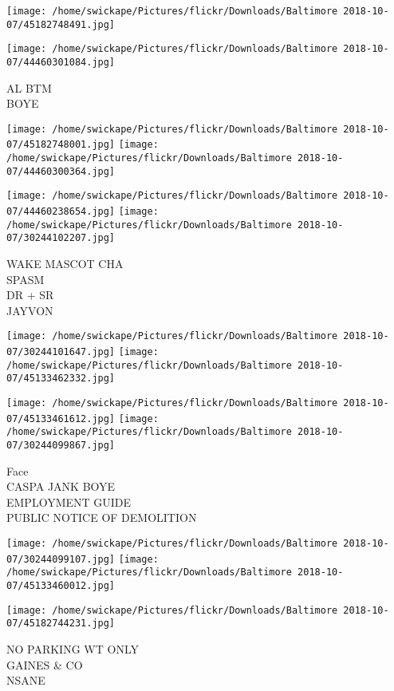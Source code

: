 \documentclass[10pt,letterpaper]{article}
\begin{document}
\texttt{[image: /home/swickape/Pictures/flickr/Downloads/Baltimore 2018-10-07/45182748491.jpg]}

\vspace{0.25in}
\texttt{[image: /home/swickape/Pictures/flickr/Downloads/Baltimore 2018-10-07/44460301084.jpg]}

AL BTM\\
BOYE\\
\pagebreak

\texttt{[image: /home/swickape/Pictures/flickr/Downloads/Baltimore 2018-10-07/45182748001.jpg]}
\texttt{[image: /home/swickape/Pictures/flickr/Downloads/Baltimore 2018-10-07/44460300364.jpg]}

\texttt{[image: /home/swickape/Pictures/flickr/Downloads/Baltimore 2018-10-07/44460238654.jpg]}
\texttt{[image: /home/swickape/Pictures/flickr/Downloads/Baltimore 2018-10-07/30244102207.jpg]}

WAKE MASCOT CHA\\
SPASM\\
DR + SR\\
JAYVON\\
\pagebreak

\texttt{[image: /home/swickape/Pictures/flickr/Downloads/Baltimore 2018-10-07/30244101647.jpg]}
\texttt{[image: /home/swickape/Pictures/flickr/Downloads/Baltimore 2018-10-07/45133462332.jpg]}

\texttt{[image: /home/swickape/Pictures/flickr/Downloads/Baltimore 2018-10-07/45133461612.jpg]}
\texttt{[image: /home/swickape/Pictures/flickr/Downloads/Baltimore 2018-10-07/30244099867.jpg]}

Face\\
CASPA JANK BOYE\\
EMPLOYMENT GUIDE\\
PUBLIC NOTICE OF DEMOLITION\\
\pagebreak

\texttt{[image: /home/swickape/Pictures/flickr/Downloads/Baltimore 2018-10-07/30244099107.jpg]}
\texttt{[image: /home/swickape/Pictures/flickr/Downloads/Baltimore 2018-10-07/45133460012.jpg]}

\vspace{0.25in}
\texttt{[image: /home/swickape/Pictures/flickr/Downloads/Baltimore 2018-10-07/45182744231.jpg]}

NO PARKING WT ONLY\\
GAINES \& CO\\
NSANE\\
\pagebreak
\end{document}
